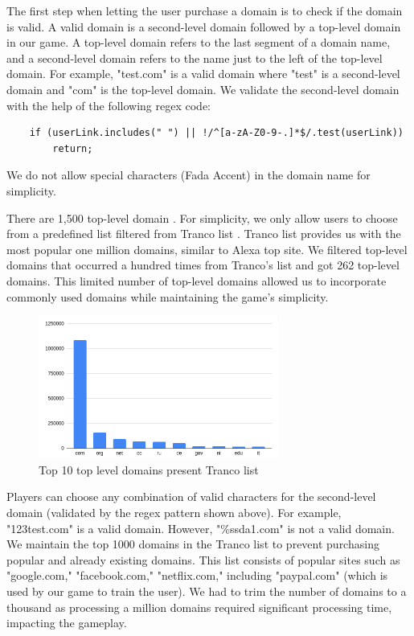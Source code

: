 The first step when letting the user purchase a domain is to check if the domain is valid. A valid domain is a second-level domain followed by a top-level domain in our game. A top-level domain refers to the last segment of a domain name, and a second-level domain refers to the name just to the left of the top-level domain. For example, "test.com" is a valid domain where "test" is a second-level domain and "com" is the top-level domain. We validate the second-level domain with the help of the following regex code:

\begin{lstlisting}
    if (userLink.includes(" ") || !/^[a-zA-Z0-9-.]*$/.test(userLink))
        return;
\end{lstlisting}

We do not allow special characters (Fada Accent) in the domain name for simplicity.

There are 1,500 top-level domain \cite{tld}. For simplicity, we only allow users to choose from a predefined list filtered from Tranco list \cite{trancos}. Tranco list provides us with the most popular one million domains, similar to Alexa top site. We filtered top-level domains that occurred a hundred times from Tranco's list and got 262 top-level domains. This limited number of top-level domains allowed us to incorporate commonly used domains while maintaining the game's simplicity.

\begin{figure}[h]
    \centering
    \includegraphics[width=0.7\textwidth]{figures/section2/tld.png}
    \caption{Top 10 top level domains present Tranco list}
    \label{fig:marketplace_tld}
\end{figure}

Players can choose any combination of valid characters for the second-level domain (validated by the regex pattern shown above). For example, "123test.com" is a valid domain. However, "\%ssda1.com" is not a valid domain. We maintain the top 1000 domains in the Tranco list to prevent purchasing popular and already existing domains. This list consists of popular sites such as "google.com," "facebook.com," "netflix.com," including "paypal.com" (which is used by our game to train the user). We had to trim the number of domains to a thousand as processing a million domains required significant processing time, impacting the gameplay.

